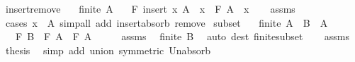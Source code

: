 \begin{isabellebody}
\isanewline
{}\isamarkupfalse%
\ insert{\isacharunderscore}{\kern0pt}remove{\isacharcolon}{\kern0pt}\isanewline
\ \ \ {\isachardoublequoteopen}finite\ A{\isachardoublequoteclose}\isanewline
\ \ \ {\isachardoublequoteopen}F\ {\isacharparenleft}{\kern0pt}insert\ x\ A{\isacharparenright}{\kern0pt}\ {\isacharequal}{\kern0pt}\ x\ \isactrlbold {\isacharasterisk}{\kern0pt}\ F\ {\isacharparenleft}{\kern0pt}A\ {\isacharminus}{\kern0pt}\ {\isacharbraceleft}{\kern0pt}x{\isacharbraceright}{\kern0pt}{\isacharparenright}{\kern0pt}{\isachardoublequoteclose}\isanewline
%
\isadelimproof
\ \ %
\endisadelimproof
%
\isatagproof
{}\isamarkupfalse%
\ assms\ \isamarkupfalse%
\ {\isacharparenleft}{\kern0pt}cases\ {\isachardoublequoteopen}x\ {\isasymin}\ A{\isachardoublequoteclose}{\isacharparenright}{\kern0pt}\ {\isacharparenleft}{\kern0pt}simp{\isacharunderscore}{\kern0pt}all\ add{\isacharcolon}{\kern0pt}\ insert{\isacharunderscore}{\kern0pt}absorb\ remove{\isacharparenright}{\kern0pt}%
\endisatagproof
{\isafoldproof}%
%
\isadelimproof
\isanewline
%
\endisadelimproof
\isanewline
{}\isamarkupfalse%
\ subset{\isacharcolon}{\kern0pt}\isanewline
\ \ \ {\isachardoublequoteopen}finite\ A{\isachardoublequoteclose}\ \ {\isachardoublequoteopen}B\ {\isasymsubseteq}\ A{\isachardoublequoteclose}\isanewline
\ \ \ {\isachardoublequoteopen}F\ B\ \isactrlbold {\isacharasterisk}{\kern0pt}\ F\ A\ {\isacharequal}{\kern0pt}\ F\ A{\isachardoublequoteclose}\isanewline
%
\isadelimproof
%
\endisadelimproof
%
\isatagproof
{}\isamarkupfalse%
\ {\isacharminus}{\kern0pt}\isanewline
\ \ \isamarkupfalse%
\ assms\ \isamarkupfalse%
\ {\isachardoublequoteopen}finite\ B{\isachardoublequoteclose}\ \isamarkupfalse%
\ {\isacharparenleft}{\kern0pt}auto\ dest{\isacharcolon}{\kern0pt}\ finite{\isacharunderscore}{\kern0pt}subset{\isacharparenright}{\kern0pt}\isanewline
\ \ \isamarkupfalse%
\ assms\ \isamarkupfalse%
\ {\isacharquery}{\kern0pt}thesis\ \isamarkupfalse%
\ {\isacharparenleft}{\kern0pt}simp\ add{\isacharcolon}{\kern0pt}\ union\ {\isacharbrackleft}{\kern0pt}symmetric{\isacharbrackright}{\kern0pt}\ Un{\isacharunderscore}{\kern0pt}absorb{}{\isacharparenright}{\kern0pt}\isanewline
{}\isamarkupfalse%
%
\endisatagproof
{\isafoldproof}%
%
\isadelimproof
\isanewline
%
\endisadelimproof
\isanewline
{}\isamarkupfalse%

\end{isabellebody}
